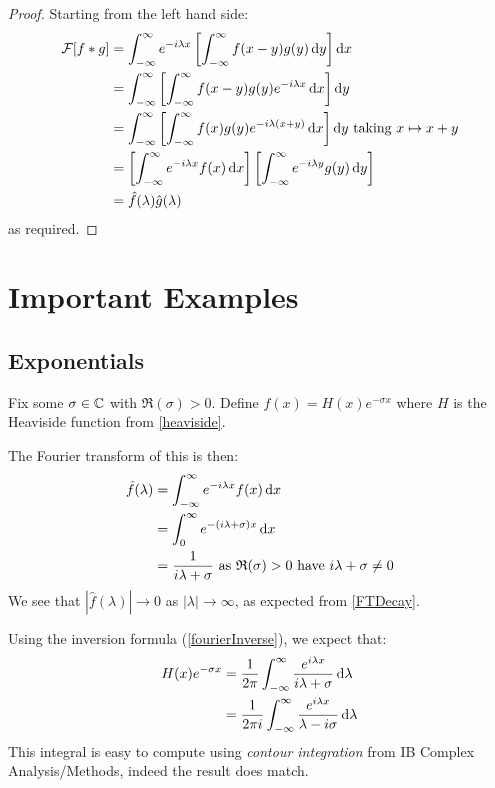 \documentclass[../main.tex]{subfiles}
\begin{document}
\begin{proof}
  Starting from the left hand side:
  \begin{align*}
    \mathcal{F}[f \ast g] &= \int_{-\infty}^{\infty} e^{-i \lambda x} \left[\int_{-\infty}^{\infty} f(x - y) g(y) \d{y}\right] \d{x} \\
                          &= \int_{-\infty}^{\infty} \left[\int_{-\infty}^{\infty} f(x - y) g(y) e^{-i\lambda x} \d{x}\right] \d{y} \\
                          &= \int_{-\infty}^{\infty} \left[\int_{-\infty}^{\infty} f(x) g(y) e^{-i\lambda(x + y)} \d{x}\right] \d{y} \text{ taking $x \mapsto x  + y$} \\
                          &= \left[\int_{-\infty}^{\infty} e^{-i \lambda x} f(x) \d{x}\right]\left[\int_{-\infty}^{\infty} e^{-i \lambda y} g(y) \d{y}\right] \\
                          &= \hat{f}(\lambda) \hat{g}(\lambda)
  \end{align*}
  as required.
\end{proof}
\section{Important Examples}
\subsection{Exponentials} \label{FTExp}
Fix some $\sigma \in \mathbb{C}$ with $\Re(\sigma) > 0$.
Define $f(x) = H(x)e^{-\sigma x}$ where $H$ is the Heaviside function from \cref{heaviside}.

The Fourier transform of this is then:
\begin{align*}
  \hat{f}(\lambda) &= \int_{-\infty}^{\infty} e^{-i \lambda x} f(x) \d{x} \\
                   &= \int_{0}^{\infty} e^{-(i \lambda + \sigma)x} \d{x} \\
                   &= \frac{1}{i \lambda + \sigma} \text{ as $\Re(\sigma) > 0$ have $i\lambda + \sigma \neq 0$}
\end{align*}
We see that $|\hat{f}(\lambda)| \to 0$ as $|\lambda| \to \infty$, as expected from \cref{FTDecay}.

Using the inversion formula (\cref{fourierInverse}), we expect that:
\begin{align*}
  H(x) e^{-\sigma x} &= \frac{1}{2\pi} \int_{-\infty}^{\infty} \frac{e^{i\lambda x}}{i\lambda + \sigma} \d{\lambda} \\
                     &= \frac{1}{2\pi i} \int_{-\infty}^{\infty} \frac{e^{i\lambda x}}{\lambda - i \sigma} \d{\lambda}
\end{align*}
This integral is easy to compute using \textit{contour integration} from IB Complex Analysis/Methods, indeed the result does match.
\end{document}
